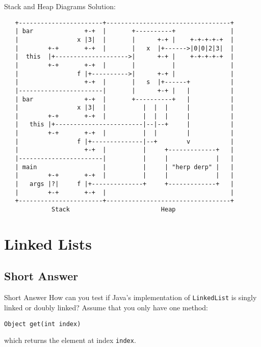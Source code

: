 \documentclass[9pt]{beamer}
\begin{document}
\begin{frame}[fragile]{Stack and Heap Diagrams}
  Solution:

  {\footnotesize
  \begin{verbatim}
   +-----------------------+----------------------------------+
   | bar              +-+  |       +----------+               |
   |                x |3|  |       |      +-+ |    +-+-+-+-+  |
   |        +-+       +-+  |       |   x  |+------>|0|0|2|3|  |
   |  this  |+-------------------->|      +-+ |    +-+-+-+-+  |
   |        +-+       +-+  |       |          |               |
   |                f |+---------->|      +-+ |               |
   |                  +-+  |       |   s  |+------+           |
   |-----------------------|       |      +-+ |   |           |
   | bar              +-+  |       +----------+   |           |
   |                x |3|  |          |  |  |     |           |
   |        +-+       +-+  |          |  |  |     |           |
   |   this |+------------------------|--|--+     |           |
   |        +-+       +-+  |          |  |        |           |
   |                f |+--------------|--+        v           |
   |                  +-+  |          |     +-------------+   |
   |-----------------------|          |     |             |   |
   | main                  |          |     | "herp derp" |   |
   |        +-+       +-+  |          |     |             |   |
   |   args |?|     f |+--------------+     +-------------+   |
   |        +-+       +-+  |                                  |
   +-----------------------+----------------------------------+
             Stack                         Heap
  \end{verbatim}
  }
\end{frame}

\section{Linked Lists}
\subsection{Short Answer}
\begin{frame}{Short Answer}
  How can you test if Java's implementation of {\tt LinkedList} is singly
  linked or doubly linked? Assume that you only have one method:

  \vspace{1cm}
  {\tt Object get(int index)}
  \vspace{1cm}

  which returns the element at index {\tt index}.
\end{frame}
\end{document}
